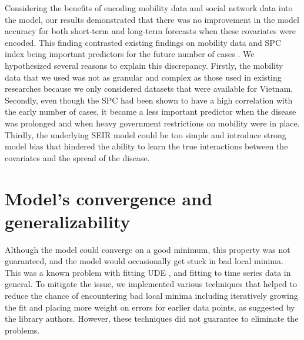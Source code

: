 Considering the benefits of encoding mobility data and social network data into the model, our results demonstrated that there was no improvement in the model accuracy for both short-term and long-term forecasts when these covariates were encoded.
This finding contrasted existing findings on mobility data and \gls{SPC} index being important predictors for the future number of cases \cite{changMobilityNetworkModels2021,kuchlerGeographicSpreadCOVID192020,arikInterpretableSequenceLearning,liSubstantialUndocumentedInfection2020}.
We hypothesized several reasons to explain this discrepancy.
Firstly, the mobility data that we used was not as granular and complex as those used in existing researches because we only considered datasets that were available for Vietnam.
Secondly, even though the \gls{SPC} had been shown to have a high correlation with the early number of cases, it became a less important predictor when the disease was prolonged and when heavy government restrictions on mobility were in place.
Thirdly, the underlying \gls{SEIR} model could be too simple and introduce strong model bias that hindered the ability to learn the true interactions between the covariates and the spread of the disease.

\section{Model's convergence and generalizability}

Although the model could converge on a good minimum, this property was not guaranteed, and the model would occasionally get stuck in bad local minima.
This was a known problem with fitting \gls{UDE} \cite{rackauckasUniversalDifferentialEquations2020}, and fitting to time series data in general.
To mitigate the issue, we implemented various techniques that helped to reduce the chance of encountering bad local minima including iteratively growing the fit and placing more weight on errors for earlier data points, as suggested by the library authors.
However, these techniques did not guarantee to eliminate the problems.

